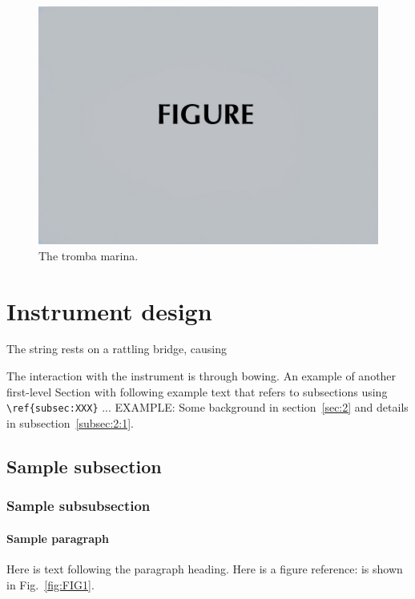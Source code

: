 \documentclass[reprint,NumberedRefs]{JASAnew}
\begin{document}
\begin{figure}[ht]
\includegraphics[width=\reprintcolumnwidth]{figsamp.jpg}
\caption{\label{fig:tromba}{The tromba marina.}}
\end{figure}

\section{\label{sec:2} Instrument design}
The string rests on a rattling bridge, causing 

The interaction with the instrument is through bowing. 
An example of another first-level Section with following example text that refers to subsections using 
\verb+\ref{subsec:XXX}+ ...  EXAMPLE: Some background in
section~\ref{sec:2} and details  in subsection~\ref{subsec:2:1}. 

\subsection{\label{subsec:2:1} Sample subsection}


   \subsubsection{Sample subsubsection\label{subsubsec:1}}

\paragraph{Sample paragraph}Here is text following the paragraph
heading.
Here is a figure reference: is shown in Fig.~\ref{fig:FIG1}.
\end{document}
